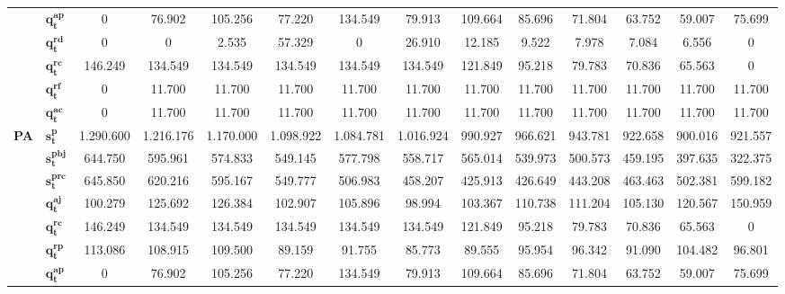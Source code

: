 \begin{table}
{\begin{tabular}{|l|l|c|c|c|c|c|c|c|c|c|c|c|c|}
& $\mathbf{q^{ap}_{t}}$ & 0 & 76.902 & 105.256 & 77.220 & 134.549 & 79.913 & 109.664 & 85.696 & 71.804 & 63.752 & 59.007 & 75.699 \\\cline{2-14}
& $\mathbf{q^{rd}_{t}}$ & 0 & 0 & 2.535 & 57.329 & 0 & 26.910 & 12.185 & 9.522 & 7.978 & 7.084 & 6.556 & 0 \\\cline{2-14}
& $\mathbf{q^{rc}_{t}}$ & 146.249 & 134.549 & 134.549 & 134.549 & 134.549 & 134.549 & 121.849 & 95.218 & 79.783 & 70.836 & 65.563 & 0 \\\cline{2-14}
& $\mathbf{q^{rf}_{t}}$ & 0 & 11.700 & 11.700 & 11.700 & 11.700 & 11.700 & 11.700 & 11.700 & 11.700 & 11.700 & 11.700 & 11.700 \\\cline{2-14}
& $\mathbf{q^{ac}_{t}}$ & 0 & 11.700 & 11.700 & 11.700 & 11.700 & 11.700 & 11.700 & 11.700 & 11.700 & 11.700 & 11.700 & 11.700 \\
\hline
\multirow{7}{*}{\textbf{PA}} & $\mathbf{s^{p}_{t}}$ & 1.290.600 & 1.216.176 & 1.170.000 & 1.098.922 & 1.084.781 & 1.016.924 & 990.927 & 966.621 & 943.781 & 922.658 & 900.016 & 921.557 \\\cline{2-14}
& $\mathbf{s^{pbj}_{t}}$ & 644.750 & 595.961 & 574.833 & 549.145 & 577.798 & 558.717 & 565.014 & 539.973 & 500.573 & 459.195 & 397.635 & 322.375 \\\cline{2-14}
& $\mathbf{s^{prc}_{t}}$ & 645.850 & 620.216 & 595.167 & 549.777 & 506.983 & 458.207 & 425.913 & 426.649 & 443.208 & 463.463 & 502.381 & 599.182 \\\cline{2-14}
& $\mathbf{q^{aj}_{t}}$ & 100.279 & 125.692 & 126.384 & 102.907 & 105.896 & 98.994 & 103.367 & 110.738 & 111.204 & 105.130 & 120.567 & 150.959 \\\cline{2-14}
& $\mathbf{q^{rc}_{t}}$ & 146.249 & 134.549 & 134.549 & 134.549 & 134.549 & 134.549 & 121.849 & 95.218 & 79.783 & 70.836 & 65.563 & 0 \\\cline{2-14}
& $\mathbf{q^{rp}_{t}}$ & 113.086 & 108.915 & 109.500 & 89.159 & 91.755 & 85.773 & 89.555 & 95.954 & 96.342 & 91.090 & 104.482 & 96.801 \\\cline{2-14}
& $\mathbf{q^{ap}_{t}}$ & 0 & 76.902 & 105.256 & 77.220 & 134.549 & 79.913 & 109.664 & 85.696 & 71.804 & 63.752 & 59.007 & 75.699 \\
\hline
\end{tabular}%
}
\fdadospesquisa
\end{table}

